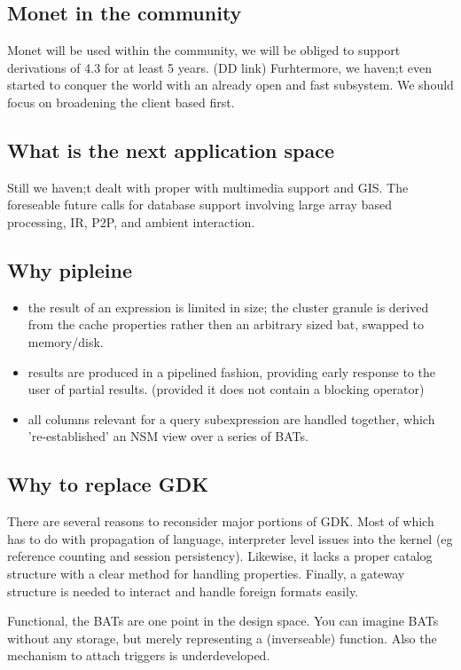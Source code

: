 \documentclass[10pt,twocolumn,fleqn]{article}
\begin{document}
\subsection{Monet in the community}

Monet will be used within the community, we will be obliged to
support derivations of 4.3 for at least 5 years. (DD link)
Furhtermore, we haven;t even started to conquer the world with
an already open and fast subsystem. We should focus on broadening
the client based first. 

\subsection{What is the next application space}
Still we haven;t dealt with proper with multimedia support and GIS.
The foreseable future calls for database support involving large
array based processing, IR, P2P, and ambient interaction.

\subsection{Why pipleine}
\begin{itemize}
\item the result of an expression is limited in size; the cluster granule 
is derived from the cache properties rather then an arbitrary sized bat, 
swapped to memory/disk.
\item results are produced in a pipelined fashion, providing early response 
to the user of partial results. (provided it does not contain a 
blocking operator)
\item all columns relevant for a query subexpression are handled together,
which 're-established' an NSM view over a series of BATs.
\end{itemize}

\subsection{Why to replace GDK}
There are several reasons to reconsider major portions of GDK.
Most of which has to do with propagation of language, interpreter level
issues into the kernel (eg reference counting and session persistency).
Likewise, it lacks a proper catalog structure with a clear method for
handling properties. Finally, a gateway structure is needed to interact
and handle foreign formats easily.

Functional, the BATs are one point in the design space. You can imagine
BATs without any storage, but merely representing a (inverseable) function.
Also the mechanism to attach triggers is underdeveloped.
\end{document}
